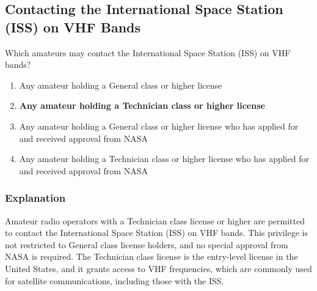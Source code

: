 \subsection{Contacting the International Space Station (ISS) on VHF Bands}
\label{T1B02}

\begin{tcolorbox}[colback=gray!10!white,colframe=black!75!black,title=T1B02]
Which amateurs may contact the International Space Station (ISS) on VHF bands?
\begin{enumerate}[label=\Alph*),noitemsep]
    \item Any amateur holding a General class or higher license
    \item \textbf{Any amateur holding a Technician class or higher license}
    \item Any amateur holding a General class or higher license who has applied for and received approval from NASA
    \item Any amateur holding a Technician class or higher license who has applied for and received approval from NASA
\end{enumerate}
\end{tcolorbox}

\subsubsection*{Explanation}
Amateur radio operators with a Technician class license or higher are permitted to contact the International Space Station (ISS) on VHF bands. This privilege is not restricted to General class license holders, and no special approval from NASA is required. The Technician class license is the entry-level license in the United States, and it grants access to VHF frequencies, which are commonly used for satellite communications, including those with the ISS.